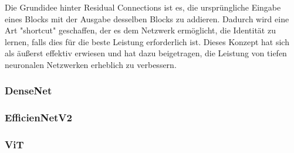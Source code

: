 Die Grundidee hinter Residual Connections ist es, die ursprüngliche Eingabe eines Blocks mit der Ausgabe desselben Blocks zu addieren. Dadurch wird eine Art "shortcut" geschaffen, der es dem Netzwerk ermöglicht, die Identität zu lernen, falls dies für die beste Leistung erforderlich ist. Dieses Konzept hat sich als äußerst effektiv erwiesen und hat dazu beigetragen, die Leistung von tiefen neuronalen Netzwerken erheblich zu verbessern.


\subsubsection{DenseNet}

\subsubsection{EfficienNetV2}

\subsubsection{ViT}

